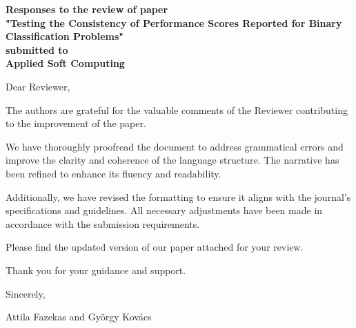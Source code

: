 \documentclass{article}[a4]
\begin{document}
\begin{center}
{
\Large\bf
Responses to the review of paper \\
"Testing the Consistency of Performance Scores Reported for Binary Classification Problems"\\
submitted to\\
Applied Soft Computing\\
}
\end{center}
\bigskip

Dear Reviewer,

\bigskip
The authors are grateful for the valuable comments of the Reviewer contributing to the improvement of the paper.

We have thoroughly proofread the document to address grammatical errors and improve the clarity and coherence of the language structure. The narrative has been refined to enhance its fluency and readability.

Additionally, we have revised the formatting to ensure it aligns with the journal's specifications and guidelines. All necessary adjustments have been made in accordance with the submission requirements.

Please find the updated version of our paper attached for your review.

Thank you for your guidance and support.

\bigskip
Sincerely,

\medskip 
Attila Fazekas and Gy\"orgy Kov\'acs
\end{document}
